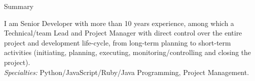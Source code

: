 \documentclass[]{mcdowellcv}
\begin{document}
    \makeheader
    \label{Contact}

    \begin{cvsection}{Summary}
        \label{Summary}
        \begin{cvsubsection}{}{}{}
            I am Senior Developer with more than 10 years experience, among which a Technical/team Lead and Project Manager with direct control over the entire project and development life-cycle, from long-term planning to short-term activities (initiating, planning, executing, monitoring/controlling and closing the project).\\
            \textit{Specialties:} Python/JavaScript/Ruby/Java Programming, Project Management.
        \end{cvsubsection}
    \end{cvsection}
\end{document}
